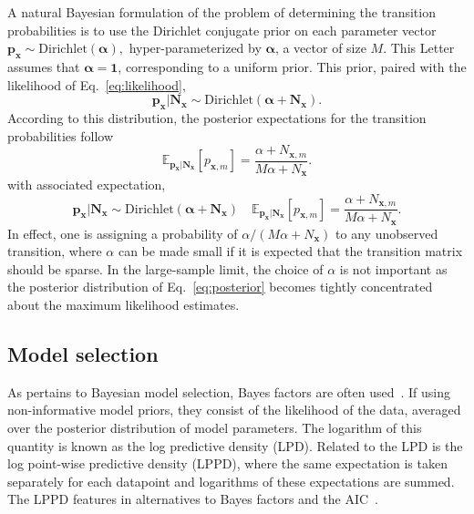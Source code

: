 \documentclass{IOS-Book-Article}
\newcommand{\bN}{\mathbf{N}}
\newcommand{\bx}{\mathbf{x}}
\newcommand{\bp}{\mathbf{p}}
\begin{document}
A natural Bayesian formulation of the
problem of determining the transition probabilities is to use the Dirichlet conjugate prior
on each parameter vector
$
\mathbf{p}_{\bx} \sim \mathrm{Dirichlet}(\boldsymbol\alpha),
$
 hyper-parameterized by $\boldsymbol\alpha$, a vector of size $M$. This Letter assumes that $\boldsymbol\alpha=\mathbf{1}$, corresponding to a uniform prior. This prior, paired with the likelihood of Eq.~\ref{eq:likelihood}, 
\begin{equation}
\mathbf{p}_{\bx}  \vert \mathbf{N}_{\bx} \sim \mathrm{Dirichlet}(\boldsymbol\alpha + \mathbf{N}_{\bx} ).
\label{eq:posterior}
\end{equation}
According to this distribution, the posterior expectations for the transition probabilities follow
\begin{equation}
\mathbb{E}_{\bp_\bx\vert\bN_\bx} [p_{\bx,m}] = \frac{\alpha + N_{\bx,m}}{M\alpha+ N_{\bx}}.
\end{equation}
 with associated expectation,
\begin{equation}
\mathbf{p}_{\bx}  \vert \mathbf{N}_{\bx} \sim \mathrm{Dirichlet}(\boldsymbol\alpha + \mathbf{N}_{\bx} ) \quad \mathbb{E}_{\bp_\bx\vert\bN_\bx} [p_{\bx,m}] = \frac{\alpha + N_{\bx,m}}{M\alpha+ N_{\bx}}.\label{eq:posterior}
\end{equation}
In effect, one is assigning a probability of $\alpha/(M\alpha+N_{\bx})$ to any unobserved transition, where $\alpha$ can be made small if it is expected that the transition matrix should be sparse.   In the large-sample limit, the choice of $\alpha$ is not important as the posterior distribution of Eq.~\ref{eq:posterior}  becomes tightly concentrated about the maximum likelihood estimates.


\subsection{Model selection}


As pertains to Bayesian model selection,  Bayes factors are often used~\cite{lavine1999bayes,posada2004model}. If using non-informative model priors, they consist of the likelihood of the data, averaged over the posterior distribution of model parameters. The logarithm of this quantity is known as the log predictive density (LPD). Related to the LPD is the log point-wise predictive density (LPPD), where the same expectation is taken separately for each datapoint and logarithms of these expectations are summed. The LPPD features in alternatives to Bayes factors and the AIC~\cite{gelman2014understanding}.
\end{document}
